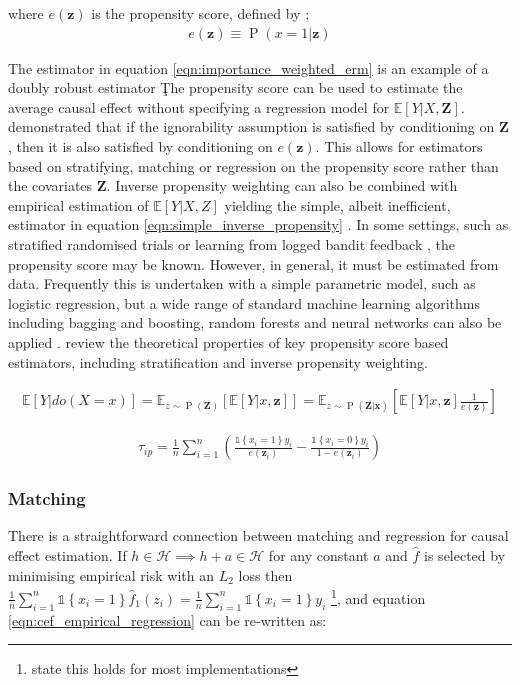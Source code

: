 \documentclass[11pt,a4paper,twoside]{report}
\newcommand{\vb}[1]{\boldsymbol{#1}}
\newcommand{\Esub}[2]{\mathbb E_{#1}\left[{#2}\right]}
\newcommand{\E}[1]{\mathbb E\left[{#1}\right]}
\newcommand{\set}[1]{\left\{#1\right\}}
\newcommand{\ind}[1]{\mathds{1}\!\!\set{#1}}
\newcommand{\eqn}[1]{\begin{align}#1\end{align}}
\renewcommand{\P}[1]{\operatorname{P}\left(#1\right)}
\theoremstyle{plain}
\theoremstyle{definition}
\begin{document}
where $e(\vb{z})$ is the propensity score, defined by \citep{Rosenbaum1983};
\eqn{
e(\vb{z})\equiv \P{x=1|\vb{z}}
}

The estimator in equation \ref{eqn:importance_weighted_erm} is an example of a doubly robust estimator \c%

The propensity score can be used to estimate the average causal effect without specifying a regression model for $\E{Y|X,\vb{Z}}$. \citet{Rosenbaum1983} demonstrated that if the ignorability assumption is satisfied by conditioning on $\vb{Z}$, then it is also satisfied by conditioning on $e(\vb{z})$. This allows for estimators based on stratifying, matching or regression on the propensity score rather than the covariates $\vb{Z}$. Inverse propensity weighting can also be combined with empirical estimation of $\E{Y|X,Z}$ yielding the simple, albeit inefficient, estimator in equation \ref{eqn:simple_inverse_propensity} \citep{Imbens2004}. In some settings, such as stratified randomised trials \citep{imbens2015causal} or learning from logged bandit feedback \citep{Bottou2013}, the propensity score may be known. However, in general, it must be estimated from data. Frequently this is undertaken with a simple parametric model, such as logistic regression, but a wide range of standard machine learning algorithms including bagging and boosting, random forests and neural networks can also be applied   \citep{Austin2011}. \citet{Lunceford2004} review the theoretical properties of key propensity score based estimators, including stratification and inverse propensity weighting. 

\eqn{
\E{Y|do(X=x)} = \Esub{z\sim \P{\vb{Z}}}{\E{Y|x,\vb{z}}} = \Esub{z\sim \P{\vb{Z|x}}}{\E{Y|x,\vb{z}}\frac{1}{e(\vb{z})}}
}

\eqn{
\label{eqn:simple_inverse_propensity}
\hat{\tau}_{ip} = \frac{1}{n}\sum_{i=1}^n \left(\frac{\ind{x_i=1}y_i}{e(\vb{z}_i)} -\frac{\ind{x_i=0}y_i}{1-e(\vb{z}_i)}\right)
}


\subsubsection{Matching}
There is a straightforward connection between matching and regression for causal effect estimation. If $h \in \mathcal{H} \implies h + a \in \mathcal{H}$ for any constant $a$ and $\hat{f}$ is selected by minimising empirical risk with an $L_2$ loss then $\frac{1}{n}\sum_{i=1}^n \ind{x_i=1}\hat{f}_1(z_i) = \frac{1}{n}\sum_{i=1}^n \ind{x_i=1}y_i$ \footnote{\citep{Imbens2004} state this holds for most implementations}, and equation \ref{eqn:cef_empirical_regression} can be re-written as: 
\end{document}
